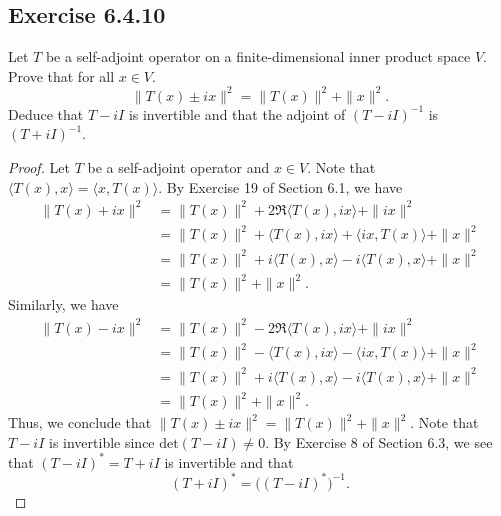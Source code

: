 \subsection*{Exercise 6.4.10} Let \( T  \) be a self-adjoint operator on a finite-dimensional inner product space \( V  \). Prove that for all \( x \in V  \).
\[ \|T(x) \pm ix\|^{2} = \|T(x)\|^{2} + \|x\|^{2}.  \]
Deduce that \( T - i I  \) is invertible and that the adjoint of \( (T - iI )^{-1} \) is \( (T + i I )^{-1} \).
\begin{proof}
Let \( T  \) be a self-adjoint operator and \( x \in V  \). Note that \( \langle T(x)  , x  \rangle = \langle x , T(x) \rangle \). By Exercise 19 of Section 6.1, we have
\begin{align*}
    \|T(x) + ix \|^{2} &= \|T(x)\|^{2} + 2 \Re \langle T(x) , ix  \rangle + \|ix \|^{2} \\
                       &= \|T(x)\|^{2} + \langle T(x)  , ix  \rangle + \langle ix  , T(x)  \rangle + \|x\|^{2}  \\
                       &= \|T(x)\|^{2} +  i \langle T(x)   , x \rangle - i \langle T(x)  , x  \rangle + \|x\|^{2} \\  
                       &= \|T(x)\|^{2} + \|x\|^{2}.
\end{align*}
Similarly, we have
\begin{align*}
    \|T(x) - ix \|^{2} &= \|T(x)\|^{2} - 2 \Re \langle T(x) , ix  \rangle + \|ix\|^{2} \\
                       &= \|T(x)\|^{2} - \langle T(x)  , ix  \rangle - \langle ix , T(x) \rangle + \|x\|^{2} \\
                       &= \|T(x)\|^{2} + i \langle T(x)  , x  \rangle - i \langle T(x)  , x  \rangle + \|x\|^{2} \\
                       &= \|T(x)\|^{2} + \|x\|^{2}.
\end{align*}
Thus, we conclude that \( \|T(x) \pm ix\|^{2} = \|T(x)\|^{2} + \|x\|^{2} \). Note that \( T - iI  \) is invertible since \( \text{det}(T - iI) \neq 0  \). By Exercise 8 of Section 6.3, we see that \( (T - iI)^{*} = T + iI \) is invertible and that 
\[ (T + iI)^{*} = \Big( (T - iI)^{*} \Big)^{-1}.  \]
\end{proof}

